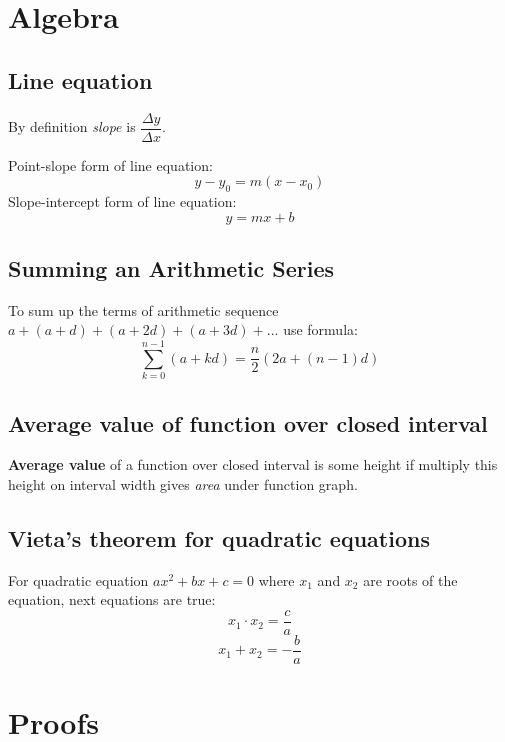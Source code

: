 \documentclass[12pt, a4paper]{scrartcl}
\begin{document}
\newpage
\onecolumn

\appendix

\section{Algebra}
\label{appendix:algebra}

\subsection{Line equation}
\label{appendix:algebra:line_equation}

By definition \textit{slope} is $\dfrac{\Delta y}{\Delta x}$.\par
Point-slope form of line equation: $$y - y_0 = m (x - x_0)$$
Slope-intercept form of line equation: $$y = mx + b$$

\subsection{Summing an Arithmetic Series}
\label{appendix:algebra:sum_arithmetic_series}
To sum up the terms of arithmetic sequence $a + (a + d) + (a + 2d) + (a + 3d) + ...$
use formula:
$$\sum_{k=0}^{n-1}(a + kd) = \dfrac{n}{2}(2a + (n-1)d)$$

\subsection{Average value of function over closed interval}
\label{appendix:algebra:av_of_func}
\textbf{Average value} of a function over closed interval is some height if multiply this height on interval width gives \textit{area} under function graph.

\subsection{Vieta's theorem for quadratic equations}
\label{appendix:algebra:vieta_theorem_for_quadratic_equations}
For quadratic equation $ax^2+bx+c=0$ where $x_1$ and $x_2$ are roots of the equation, next equations are true:
$$x_1 \cdot x_2 = \dfrac{c}{a}$$
$$x_1 + x_2 = -\dfrac{b}{a}$$

\section{Proofs}
\end{document}

